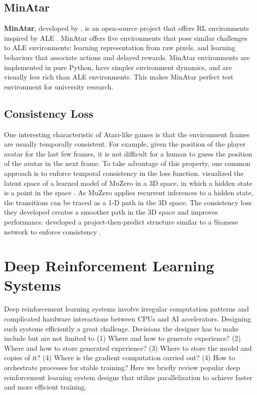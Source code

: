 \subsection{MinAtar} \label{sec:min_atar}
\textbf{MinAtar}, developed by \citeauthor{MinAtarAtariInspiredTestbed_Young.Tian_2019}, is an open-source project that offers RL environments inspired by ALE \cite{MinAtarAtariInspiredTestbed_Young.Tian_2019}.
MinAtar offers five environments that pose similar challenges to ALE environments: learning representation from raw pixels, and learning behaviors that associate actions and delayed rewards.
MinAtar environments are implemented in pure Python, have simpler environment dynamics, and are visually less rich than ALE environments.
This makes MinAtar perfect test environment for university research.

\subsection{Consistency Loss}
One interesting characteristic of Atari-like games is that the environment frames are usually temporally consistent.
For example, given the position of the player avatar for the last few frames, it is not difficult for a human to guess the position of the avatar in the next frame.
To take advantage of this property, one common approach is to enforce temporal consistency in the loss function.
 visualized the latent space of a learned model of MuZero in a 3D space, in which a hidden state is a point in the space \cite{VisualizingMuZeroModels_deVries.Voskuil.ea_2021}.
As MuZero applies recurrent inferences to a hidden state, the transitions can be traced as a 1-D path in the 3D space.
The consistency loss they developed creates a smoother path in the 3D space and improves performance.
 developed a project-then-predict structure similar to a Siamese network to enforce consistency \cite{MasteringAtariGames_Ye.Liu.ea_2021,SiameseNeuralNetworks_Koch.Zemel.ea_}.

\section{Deep Reinforcement Learning Systems} \label{sec:drl_systems}
Deep reinforcement learning systems involve irregular computation patterns and complicated hardware interactions between CPUs and AI accelerators.
Designing such systems efficiently a great challenge.
Decisions the designer has to make include but are not limited to (1) Where and how to generate experience? (2) Where and how to store generated experience? (3) Where to store the model and copies of it? (4) Where is the gradient computation carried out? (4) How to orchestrate processes for stable training?
Here we briefly review popular deep reinforcement learning system designs that utilize parallelization to achieve faster and more efficient training.

